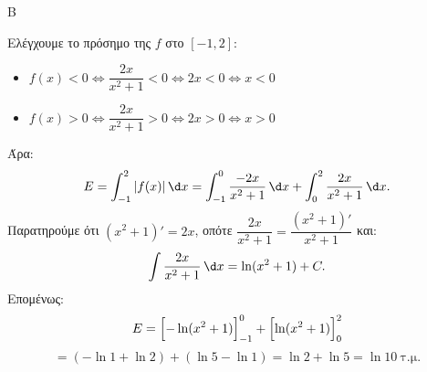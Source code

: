 \begin{thema}{Β}
\begin{erwthma}
Ελέγχουμε το πρόσημο της $f$ στο $[-1,2]$:
\begin{itemize}
    \item $f(x)<0\Leftrightarrow \dfrac{2x}{x^2+1}<0\Leftrightarrow 2x<0\Leftrightarrow x<0$
    \item $f(x)>0\Leftrightarrow \dfrac{2x}{x^2+1}>0\Leftrightarrow 2x>0\Leftrightarrow x>0$
\end{itemize}
Άρα:
\[
E=\int_{-1}^{2}|f(x)|\,\d x
=\int_{-1}^{0}\frac{-2x}{x^2+1}\,\d x+\int_0^{2}\frac{2x}{x^2+1}\,\d x.
\]
Παρατηρούμε ότι $(x^2+1)'=2x$, οπότε $\dfrac{2x}{x^2+1}=\dfrac{(x^2+1)'}{x^2+1}$ και:
\[
\int\frac{2x}{x^2+1}\,\d x=\ln(x^2+1)+C.
\]
Επομένως:
\[
E=\Bigl[-\ln(x^2+1)\Bigr]_{-1}^{0}+\Bigl[\ln(x^2+1)\Bigr]_0^{2}
\]
\[
=(-\ln1+\ln2)+(\ln5-\ln1)=\ln2+\ln5=\ln10\ \text{τ.μ.}
\]

\end{erwthma}
\end{thema}
